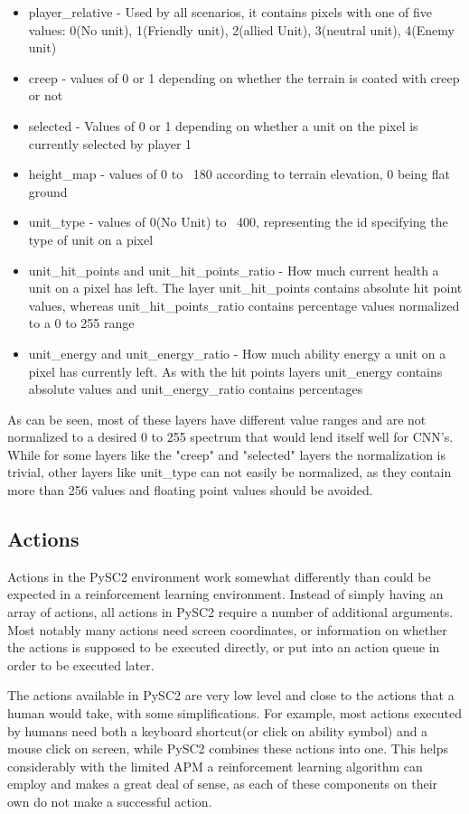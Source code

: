 \begin{itemize}
\item player\_relative - Used by all scenarios, it contains pixels with one of five values: 0(No unit), 1(Friendly unit), 2(allied Unit), 3(neutral unit), 4(Enemy unit)
\item creep - values of 0 or 1 depending on whether the terrain is coated with creep or not
\item selected - Values of 0 or 1 depending on whether a unit on the pixel is currently selected by player 1
\item height\_map - values of 0 to ~180 according to terrain elevation, 0 being flat ground
\item unit\_type - values of 0(No Unit) to ~400, representing the id specifying the type of unit on a pixel
\item unit\_hit\_points and unit\_hit\_points\_ratio - How much current health a unit on a pixel has left. The layer unit\_hit\_points contains absolute hit point values, whereas unit\_hit\_points\_ratio contains percentage values normalized to a 0 to 255 range
\item unit\_energy and unit\_energy\_ratio - How much ability energy a unit on a pixel has currently left. As with the hit points layers unit\_energy contains absolute values and unit\_energy\_ratio contains percentages
\end{itemize}
As can be seen, most of these layers have different value ranges and are not normalized to a desired 0 to 255 spectrum that would lend itself well for CNN's. While for some layers like the "creep" and "selected" layers the normalization is trivial, other layers like unit\_type can not easily be normalized, as they contain more than 256 values and floating point values should be avoided.


\subsection{Actions}
Actions in the PySC2 environment work somewhat differently than could be expected in a reinforcement learning environment. Instead of simply having an array of actions, all actions in PySC2 require a number of additional arguments. Most notably many actions need screen coordinates, or information on whether the actions is supposed to be executed directly, or put into an action queue in order to be executed later. 

The actions available in PySC2 are very low level and close to the actions that a human would take, with some simplifications. For example, most actions executed by humans need both a keyboard shortcut(or click on ability symbol) and a mouse click on screen, while PySC2 combines these actions into one. This helps considerably with the limited APM a reinforcement learning algorithm can employ and makes a great deal of sense, as each of these components on their own do not make a successful action.

